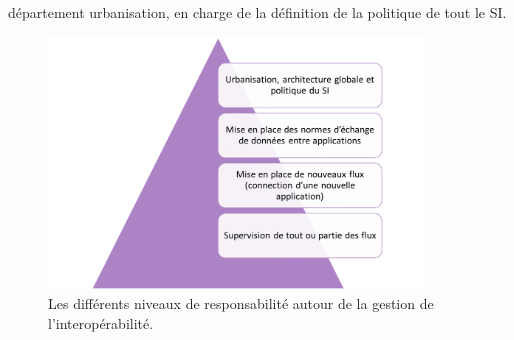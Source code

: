 			département urbanisation, en charge de la définition de la politique de tout le SI.
			\begin{figure}[H]
				\centering
				\includegraphics[width=10cm]{../img/si_1.png}
				\caption{\label{orga_interop} Les différents niveaux de responsabilité
				autour de la gestion de l'interopérabilité.}
			\end{figure}
			
